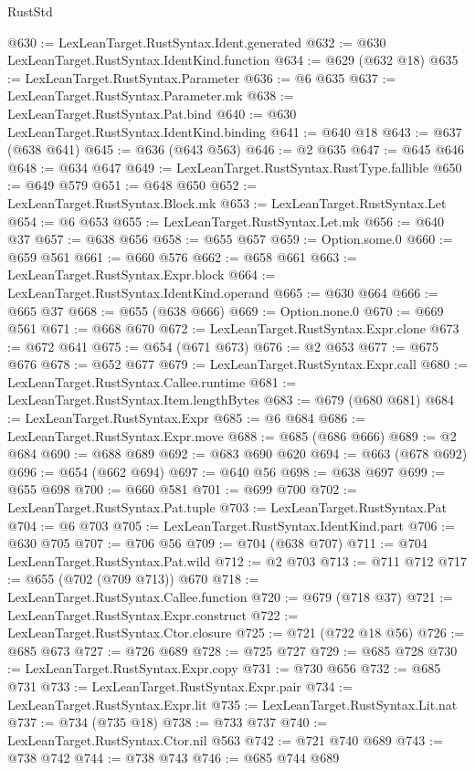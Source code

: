 \begin{lexlean}{RustStd}
\begin{coremodule}
@630 := LexLeanTarget.RustSyntax.Ident.generated
@632 := @630 LexLeanTarget.RustSyntax.IdentKind.function
@634 := @629 (@632 @18)
@635 := LexLeanTarget.RustSyntax.Parameter
@636 := @6 @635
@637 := LexLeanTarget.RustSyntax.Parameter.mk
@638 := LexLeanTarget.RustSyntax.Pat.bind
@640 := @630 LexLeanTarget.RustSyntax.IdentKind.binding
@641 := @640 @18
@643 := @637 (@638 @641)
@645 := @636 (@643 @563)
@646 := @2 @635
@647 := @645 @646
@648 := @634 @647
@649 := LexLeanTarget.RustSyntax.RustType.fallible
@650 := @649 @579
@651 := @648 @650
@652 := LexLeanTarget.RustSyntax.Block.mk
@653 := LexLeanTarget.RustSyntax.Let
@654 := @6 @653
@655 := LexLeanTarget.RustSyntax.Let.mk
@656 := @640 @37
@657 := @638 @656
@658 := @655 @657
@659 := Option.some.{0}
@660 := @659 @561
@661 := @660 @576
@662 := @658 @661
@663 := LexLeanTarget.RustSyntax.Expr.block
@664 := LexLeanTarget.RustSyntax.IdentKind.operand
@665 := @630 @664
@666 := @665 @37
@668 := @655 (@638 @666)
@669 := Option.none.{0}
@670 := @669 @561
@671 := @668 @670
@672 := LexLeanTarget.RustSyntax.Expr.clone
@673 := @672 @641
@675 := @654 (@671 @673)
@676 := @2 @653
@677 := @675 @676
@678 := @652 @677
@679 := LexLeanTarget.RustSyntax.Expr.call
@680 := LexLeanTarget.RustSyntax.Callee.runtime
@681 := LexLeanTarget.RustSyntax.Item.lengthBytes
@683 := @679 (@680 @681)
@684 := LexLeanTarget.RustSyntax.Expr
@685 := @6 @684
@686 := LexLeanTarget.RustSyntax.Expr.move
@688 := @685 (@686 @666)
@689 := @2 @684
@690 := @688 @689
@692 := @683 @690 @620
@694 := @663 (@678 @692)
@696 := @654 (@662 @694)
@697 := @640 @56
@698 := @638 @697
@699 := @655 @698
@700 := @660 @581
@701 := @699 @700
@702 := LexLeanTarget.RustSyntax.Pat.tuple
@703 := LexLeanTarget.RustSyntax.Pat
@704 := @6 @703
@705 := LexLeanTarget.RustSyntax.IdentKind.part
@706 := @630 @705
@707 := @706 @56
@709 := @704 (@638 @707)
@711 := @704 LexLeanTarget.RustSyntax.Pat.wild
@712 := @2 @703
@713 := @711 @712
@717 := @655 (@702 (@709 @713)) @670
@718 := LexLeanTarget.RustSyntax.Callee.function
@720 := @679 (@718 @37)
@721 := LexLeanTarget.RustSyntax.Expr.construct
@722 := LexLeanTarget.RustSyntax.Ctor.closure
@725 := @721 (@722 @18 @56)
@726 := @685 @673
@727 := @726 @689
@728 := @725 @727
@729 := @685 @728
@730 := LexLeanTarget.RustSyntax.Expr.copy
@731 := @730 @656
@732 := @685 @731
@733 := LexLeanTarget.RustSyntax.Expr.pair
@734 := LexLeanTarget.RustSyntax.Expr.lit
@735 := LexLeanTarget.RustSyntax.Lit.nat
@737 := @734 (@735 @18)
@738 := @733 @737
@740 := LexLeanTarget.RustSyntax.Ctor.nil @563
@742 := @721 @740 @689
@743 := @738 @742
@744 := @738 @743
@746 := @685 @744 @689

\end{coremodule}
\end{lexlean}

